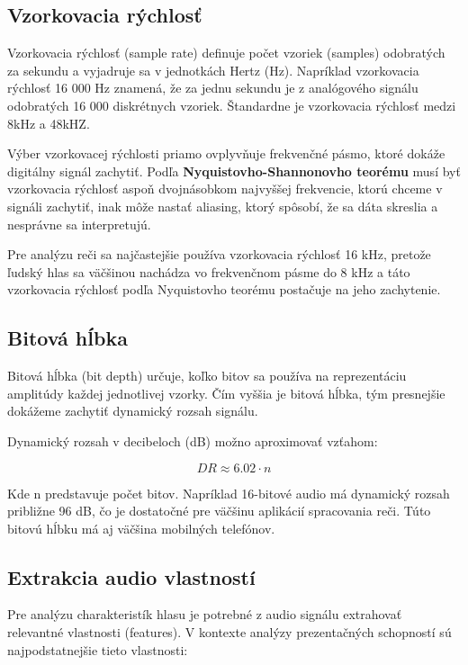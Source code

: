 \subsection{Vzorkovacia rýchlosť}

Vzorkovacia rýchlosť (sample rate) definuje počet vzoriek (samples) odobratých za sekundu a vyjadruje sa v jednotkách Hertz (Hz). Napríklad vzorkovacia rýchlosť 16 000 Hz znamená, že za jednu sekundu je z analógového signálu odobratých 16 000 diskrétnych vzoriek. Štandardne je vzorkovacia rýchlosť medzi 8kHz a 48kHZ.\cite{sampleRateExplained}

Výber vzorkovacej rýchlosti priamo ovplyvňuje frekvenčné pásmo, ktoré dokáže digitálny signál zachytiť. Podľa \textbf{Nyquistovho-Shannonovho teorému} musí byť vzorkovacia rýchlosť aspoň dvojnásobkom najvyššej frekvencie, ktorú chceme v signáli zachytiť, inak môže nastať aliasing, ktorý spôsobí, že sa dáta skreslia a nesprávne sa interpretujú.\cite{nyqshanSamplingTheorem}

Pre analýzu reči sa najčastejšie používa vzorkovacia rýchlosť 16 kHz, pretože ľudský hlas sa väčšinou nachádza vo frekvenčnom pásme do 8 kHz a táto vzorkovacia rýchlosť podľa Nyquistovho teorému postačuje na jeho zachytenie. \cite{sampleRateExplained}

\subsection{Bitová hĺbka}

Bitová hĺbka (bit depth) určuje, koľko bitov sa používa na reprezentáciu amplitúdy každej jednotlivej vzorky. Čím vyššia je bitová hĺbka, tým presnejšie dokážeme zachytiť dynamický rozsah signálu\cite{bitDepth}.

Dynamický rozsah v decibeloch (dB) možno aproximovať vzťahom:

\begin{equation}
    DR \approx 6.02 \cdot n
\end{equation}

Kde n predstavuje počet bitov. Napríklad 16-bitové audio má dynamický rozsah približne 96 dB, čo je dostatočné pre väčšinu aplikácií spracovania reči. Túto bitovú hĺbku má aj väčšina mobilných telefónov.

\subsection{Extrakcia audio vlastností}

Pre analýzu charakteristík hlasu je potrebné z audio signálu extrahovať relevantné vlastnosti (features). V kontexte analýzy prezentačných schopností sú najpodstatnejšie tieto vlastnosti:


